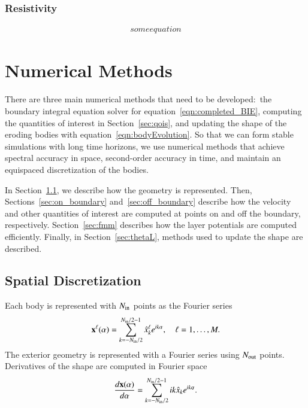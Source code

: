 \documentclass[preprint, 10pt]{elsarticle}
\begin{document}
\subsubsection{Resistivity}
\begin{align}
  some equation
  \label{eqn:resistivity}
\end{align}



\section{Numerical Methods\label{s:method}} 
There are three main numerical methods that need to be developed:~the
boundary integral equation solver for
equation~\eqref{eqn:completed_BIE}, computing the quantities of interest
in Section~\ref{sec:qois}, and updating the shape of the eroding bodies
with equation~\eqref{eqn:bodyEvolution}.  So that we can form stable
simulations with long time horizons, we use numerical methods that
achieve spectral accuracy in space, second-order accuracy in time, and
maintain an equispaced discretization of the bodies.

In Section~\ref{sec:spatial_discretization}, we describe how the
geometry is represented.  Then, Sections~\ref{sec:on_boundary}
and~\ref{sec:off_boundary} describe how the velocity and other
quantities of interest are computed at points on and off the boundary,
respectively.  Section~\ref{sec:fmm} describes how the layer potentials
are computed efficiently.  Finally, in Section~\ref{sec:thetaL}, methods
used to update the shape are described.


\subsection{Spatial Discretization}
\label{sec:spatial_discretization}
Each body is represented with $N_{\mathrm{in}}$ points as the Fourier series
\begin{align*}
  {\mathbf{x}}^\ell(\alpha) = \sum_{k = -N_{\mathrm{in}} /2}^{N_{\mathrm{in}} /2-1} \hat{x}_k^\ell e^{ik\alpha}, \quad \ell=1,\ldots,M.
\end{align*}
The exterior geometry is represented with a Fourier series using
$N_{\mathrm{out}}$ points.  Derivatives of the shape are computed in Fourier space
\begin{align*}
  \frac{d{\mathbf{x}}(\alpha)}{d\alpha} = \sum_{k = -N_{\mathrm{in}} /2}^{N_{\mathrm{in}} /2-1} ik\hat{x}_k e^{ik\alpha}.
\end{align*}
\end{document}
